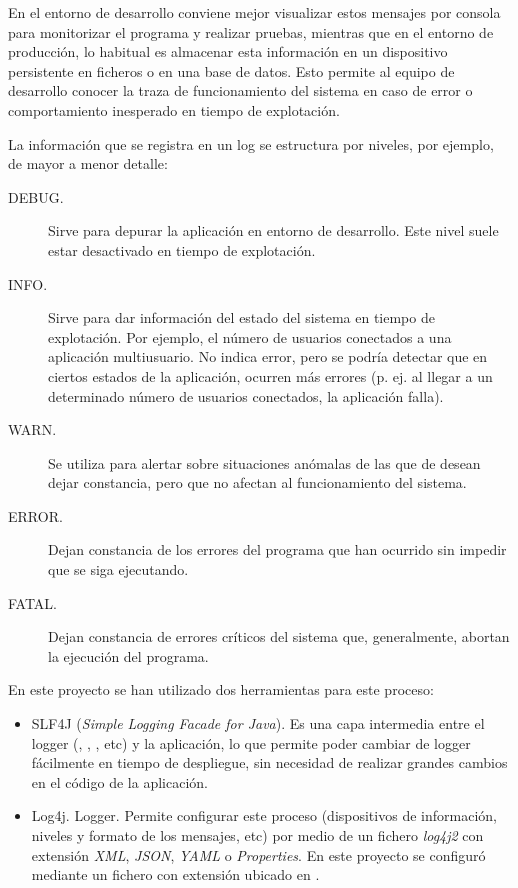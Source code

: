 En el entorno de desarrollo conviene mejor visualizar estos mensajes por consola para monitorizar el programa y realizar pruebas, mientras que en el entorno de producción, lo habitual es almacenar esta información en un dispositivo persistente en ficheros o en una base de datos. Esto permite al equipo de desarrollo conocer la traza de funcionamiento del sistema en caso de error o comportamiento inesperado en tiempo de explotación.

La información que se registra en un log se estructura por niveles, por ejemplo, de mayor a menor detalle:
\begin{description}
	\item[DEBUG.] Sirve para depurar la aplicación en entorno de desarrollo. Este nivel suele estar desactivado en tiempo de explotación.
	\item[INFO.] Sirve para dar información del estado del sistema en tiempo de explotación. Por ejemplo, el número de usuarios conectados a una aplicación multiusuario. No indica error, pero se podría detectar que en ciertos estados de la aplicación, ocurren más errores (p. ej. al llegar a un determinado número de usuarios conectados, la aplicación falla).
	\item[WARN.] Se utiliza para alertar sobre situaciones anómalas de las que de desean dejar constancia, pero que no afectan al funcionamiento del sistema. 
	\item[ERROR.] Dejan constancia de los errores del programa que han ocurrido sin impedir que se siga ejecutando.
	\item[FATAL.] Dejan constancia de errores críticos del sistema que, generalmente, abortan la ejecución del programa.
\end{description}

En este proyecto se han utilizado dos herramientas para este proceso:
\begin{itemize}
	\item SLF4J (\textit{Simple Logging Facade for Java}). Es una capa intermedia entre el logger (, , , etc) y la aplicación, lo que permite poder cambiar de logger fácilmente en tiempo de despliegue, sin necesidad de realizar grandes cambios en el código de la aplicación.
	
	\item Log4j. Logger. Permite configurar este proceso (dispositivos de información, niveles y formato de los mensajes, etc) por medio de un fichero \textit{log4j2} con extensión \textit{XML}, \textit{JSON}, \textit{YAML} o \textit{Properties}. En este proyecto se configuró mediante un fichero con extensión  ubicado en .
\end{itemize}

